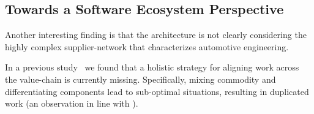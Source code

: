 \subsection{Towards a Software Ecosystem Perspective}\label{sec:subcontractors}

Another interesting finding is that the architecture is not clearly considering the highly complex supplier-network that characterizes automotive engineering. 

%
In a previous study~\cite{Soltani2015,Soltani2015a} 
we found that a holistic strategy for aligning work across the value-chain is currently missing. 
Specifically, mixing commodity and differentiating components lead to sub-optimal situations, resulting in duplicated work (an observation in line with \cite{OB2015}).  

